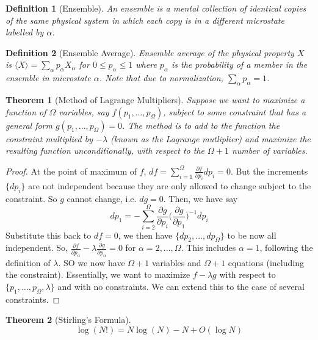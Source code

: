 \documentclass[a4paper]{article}
\theoremstyle{new}
\newtheorem{defi}{Definition}[section]
\newtheorem{thm}{Theorem}[section]
\begin{document}
\begin{defi}[Ensemble]
An ensemble is a mental collection of identical copies of the same physical system in which each copy is in a different microstate labelled by $\alpha$.
\end{defi}
\begin{defi}[Ensemble Average]
Ensemble average of the physical property $X$ is $\langle X\rangle=\sum_\alpha p_\alpha X_\alpha$ for $0\leq p_\alpha\leq 1$ where $p_\alpha$ is the probability of a member in the ensemble in microstate $\alpha$. Note that due to normalization, $\sum_\alpha p_\alpha=1$.
\end{defi}
\begin{thm}[Method of Lagrange Multipliers]
Suppose we want to maximize a function of $\Omega$ variables, say $f(p_1,...,p_\Omega)$, subject to some constraint that has a general form $g(p_1,...,p_\Omega)=0$. The method is to add to the function the constraint multiplied by $-\lambda$ (known as the Lagrange mutliplier) and maximize the resulting function unconditionally, with respect to the $\Omega+1$ number of variables.
\end{thm}
\begin{proof}
At the point of maximum of $f$, $df=\sum_{i=1}^\Omega\frac{\partial f}{\partial p_i}dp_i=0$. But the increments $\{dp_i\}$ are not independent because they are only allowed to change subject to the constraint. So $g$ cannot change, i.e. $dg=0$. Then, we have say
$$dp_1=-\sum_{i=2}^\Omega\frac{\partial g}{\partial p_i}\bigg(\frac{\partial g}{\partial p_1}\bigg)^{-1}dp_i$$
Substitute this back to $df=0$, we then have $\{dp_2,...,dp_\Omega\}$ to be now all independent. So, $\frac{\partial f}{\partial p_\alpha}-\lambda\frac{\partial g}{\partial p_\alpha}=0$ for $\alpha=2,...,\Omega$. This includes $\alpha=1$, following the definition of $\lambda$. SO we now have $\Omega+1$ variables and $\Omega+1$ equations (including the constraint). Essentially, we want to maximize $f-\lambda g$ with respect to $\{p_1,...,p_\Omega,\lambda\}$ and with no constraints. We can extend this to the case of several constraints.
\end{proof}
\begin{thm}[Stirling's Formula]
$$\log(N!)=N\log(N)-N+O(\log N)$$
\end{thm}
\newpage
\end{document}
